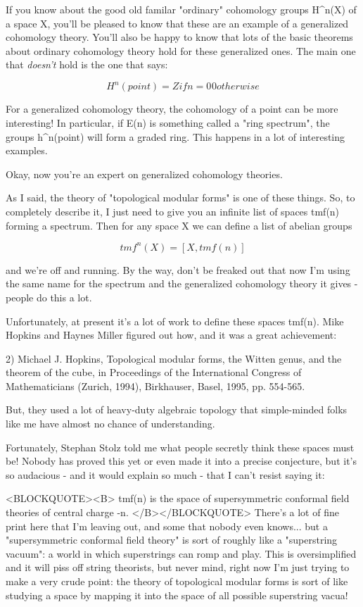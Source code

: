 If you know about the good old familar "ordinary" cohomology groups 
H^{n}(X) of a space X, you'll be pleased to know that these are an 
example of a generalized cohomology theory.  You'll also be happy 
to know that lots of the basic theorems about ordinary cohomology 
theory hold for these generalized ones.  The main one that \emph{doesn't}
hold is the one that says: 

$$
H^{n}(point) = Z  if n = 0
^{ }           0  otherwise
$$
    
For a generalized cohomology theory, the cohomology of a point
can be more interesting!  In particular, if E(n) is something called
a "ring spectrum", the groups h^{n}(point) will form a 
graded ring.
This happens in a lot of interesting examples.

Okay, now you're an expert on generalized cohomology theories.

As I said, the theory of "topological modular forms" is one of
these things.  So, to completely describe it, I just need to
give you an infinite list of spaces tmf(n) forming a spectrum.  
Then for any space X we can define a list of abelian groups 

$$
tmf^{n}(X) = [X,tmf(n)]
$$
    
and we're off and running.  By the way, don't be freaked out that 
now I'm using the same name for the spectrum and the generalized 
cohomology theory it gives - people do this a lot.

Unfortunately, at present it's a lot of work to define these 
spaces tmf(n).  Mike Hopkins and Haynes Miller figured out how,
and it was a great achievement:

2) Michael J. Hopkins, Topological modular forms, the Witten
genus, and the theorem of the cube, in Proceedings of the 
International Congress of Mathematicians (Zurich, 1994), 
Birkhauser, Basel, 1995, pp. 554-565.

But, they used a lot of heavy-duty algebraic topology that 
simple-minded folks like me have almost no chance of understanding.  

Fortunately, Stephan Stolz told me what people secretly think
these spaces must be!  Nobody has proved this yet or even
made it into a precise conjecture, but it's so audacious - 
and it would explain so much - that I can't resist saying it:

<BLOCKQUOTE><B>
  tmf(n) is the space of supersymmetric conformal field theories 
                   of central charge -n.
</B></BLOCKQUOTE>
There's a lot of fine print here that I'm leaving out, and some 
that nobody even knows... but a "supersymmetric conformal field 
theory" is sort of roughly like a "superstring vacuum": a world
in which superstrings can romp and play.  This is oversimplified
and it will piss off string theorists, but never mind, right now 
I'm just trying to make a very crude point: the theory of 
topological modular forms is sort of like studying a space by 
mapping it into the space of all possible superstring vacua!

